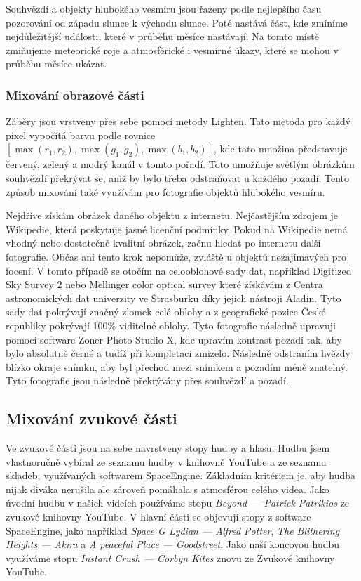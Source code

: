 \documentclass[12pt,a4paper,titlepage]{article}
\begin{document}
Souhvězdí a objekty hlubokého vesmíru jsou řazeny podle nejlepšího času pozorování od západu slunce k východu slunce. Poté nastává část, kde zmíníme nejdůležitější události, které v průběhu měsíce nastávají. Na tomto místě zmiňujeme meteorické roje a atmosférické i vesmírné úkazy, které se mohou v průběhu měsíce ukázat.
\subsubsection{Mixování obrazové části}
Záběry jsou vrstveny přes sebe pomocí metody Lighten. Tato metoda pro každý pixel vypočítá barvu podle rovnice $[\max(r_1, r_2), \max(g_1, g_2), \max(b_1, b_2)]$, kde tato množina představuje červený, zelený a modrý kanál v tomto pořadí. Toto umožňuje světlým obrázkům souhvězdí překrývat se, aniž by bylo třeba odstraňovat u každého pozadí. Tento způsob mixování také využívám pro fotografie objektů hlubokého vesmíru. 

Nejdříve získám obrázek daného objektu z internetu. Nejčastějším zdrojem je Wikipedie, která poskytuje jasné licenční podmínky. Pokud na Wikipedie nemá vhodný nebo dostatečně kvalitní obrázek, začnu hledat po internetu další fotografie. Občas ani tento krok nepomůže, zvláště u objektů nezajímavých pro focení. V tomto případě se otočím na celooblohové sady dat, například Digitized Sky Survey 2 nebo Mellinger color optical survey které získávám z Centra astronomických dat univerzity ve Štrasburku díky jejich nástroji Aladin. Tyto sady dat pokrývají značný zlomek celé oblohy a z geografické pozice České republiky pokrývají 100\% viditelné oblohy. Tyto fotografie následně upravuji pomocí software Zoner Photo Studio X, kde upravím kontrast pozadí tak, aby bylo absolutně černé a tudíž při kompletaci zmizelo. Následně odstraním hvězdy blízko okraje snímku, aby byl přechod mezi snímkem a pozadím méně znatelný. Tyto fotografie jsou následně překrývány přes souhvězdí a pozadí. 
\subsection{Mixování zvukové části}
Ve zvukové části jsou na sebe navrstveny stopy hudby a hlasu. Hudbu jsem vlastnoručně vybíral ze seznamu hudby v knihovně YouTube a ze seznamu skladeb, využívaných softwarem SpaceEngine. Základním kritériem je, aby hudba nijak diváka nerušila ale zároveň pomáhala s atmosférou celého videa. Jako úvodní hudbu v našich videích používáme stopu \textit{Beyond --- Patrick Patrikios} ze zvukové knihovny YouTube. V hlavní části se objevují stopy z software SpaceEngine, jako například \textit{Space G Lydian --- Alfred Potter}, \textit{The Blithering Heights --- Akira} a \textit{A peaceful Place --- Goodstreet}. Jako naší koncovou hudbu využíváme stopu \textit{Instant Crush --- Corbyn Kites} znovu ze Zvukové knihovny YouTube.
\end{document}
